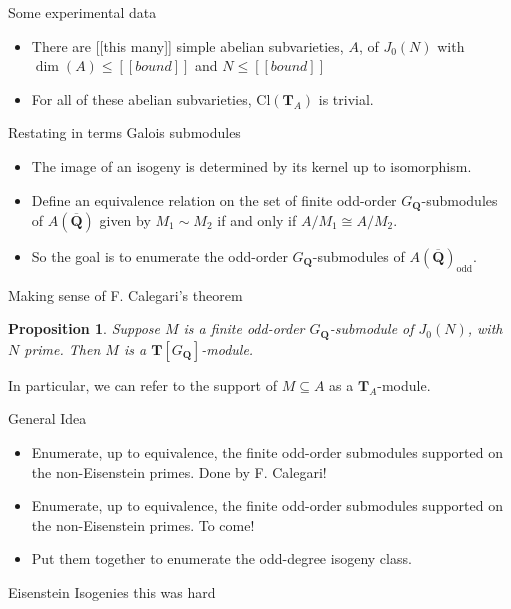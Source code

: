 \documentclass{beamer}
\newtheorem{proposition}[theorem]{Proposition}
\newcommand{\QQ}{\mathbf{Q}}
\newcommand{\QQbar}{\overline{\mathbf{Q}}}
\newcommand{\TT}{\mathbf{T}}
\newcommand{\Cl}{\mathrm{Cl}}
\begin{document}
\begin{frame}{Some experimental data}
    \begin{itemize}
        \item 
            There are [[this many]] simple abelian subvarieties, $A$, of
            $J_0(N)$ with $\dim(A)\leq [[bound]]$ and $N\leq [[bound]]$
        \item
            For all of these abelian subvarieties, $\Cl(\TT_A)$ is trivial.
    \end{itemize} 
\end{frame}

\begin{frame}{Restating in terms Galois submodules}
    \begin{itemize}
        \item 
            The image of an isogeny is determined by its kernel up to isomorphism. 
        \item
            Define an equivalence relation on the set of finite odd-order
            $G_\QQ$-submodules of $A(\QQbar)$ given by $M_1\sim M_2$ if and only if
            $A/M_1\cong A/M_2$.
        \item
            So the goal is to enumerate the odd-order $G_\QQ$-submodules of
            $A(\QQbar)_\mathrm{odd}$.
    \end{itemize}
\end{frame}

\begin{frame}{Making sense of F. Calegari's theorem}
    \begin{proposition}
        Suppose $M$ is a finite odd-order $G_\QQ$-submodule of $J_0(N)$, with $N$
        prime. Then $M$ is a $\TT[G_\QQ]$-module.
    \end{proposition}

    In particular, we can refer to the support of $M\subseteq A$ as a
    $\TT_A$-module.
\end{frame}

\begin{frame}{General Idea}
    \begin{itemize}
        \item 
            Enumerate, up to equivalence, the finite odd-order submodules
            supported on the non-Eisenstein primes. Done by F. Calegari!
        \item
            Enumerate, up to equivalence, the finite odd-order submodules
            supported on the non-Eisenstein primes. To come!
        \item
            Put them together to enumerate the odd-degree isogeny class.
    \end{itemize}
\end{frame}

\begin{frame}{Eisenstein Isogenies}
    this was hard
\end{frame}

    
\end{document}
